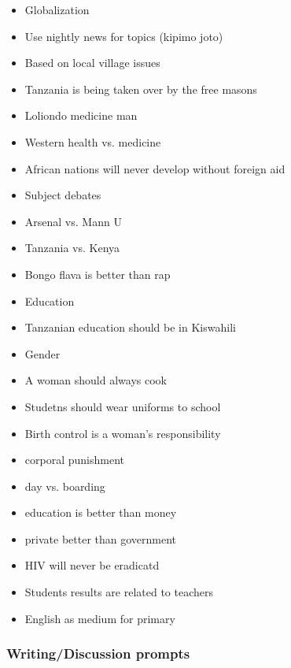\documentclass[12pt,a4paper]{report}
\begin{document}
\begin{itemize}

\item{Globalization}
\item{Use nightly news for topics (kipimo joto)}
\item{Based on local village issues}
\item{Tanzania is being taken over by the free masons}
\item{Loliondo medicine man}
\item{Western health vs. medicine}
\item{African nations will never develop without foreign aid}
\item{Subject debates}
\item{Arsenal vs. Mann U}
\item{Tanzania vs. Kenya}
\item{Bongo flava is better than rap}
\item{Education}
\item{Tanzanian education should be in Kiswahili}
\item{Gender}
\item{A woman should always cook}
\item{Studetns should wear uniforms to school}
\item{Birth control is a woman’s responsibility}
\item{corporal punishment}
\item{day vs. boarding}
\item{education is better than money}
\item{private better than government}
\item{HIV will never be eradicatd}
\item{Students results are related to teachers}
\item{English as medium for primary}

\end{itemize}

\subsubsection{Writing/Discussion prompts}
\end{document}
